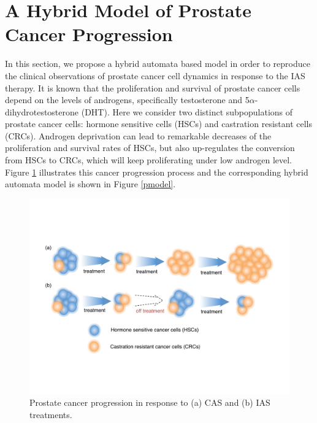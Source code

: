 \section{A Hybrid Model of Prostate Cancer Progression }\label{sec.model}

In this section, we propose a hybrid automata based model in order to reproduce the clinical observations \cite{bruchovsky06, bruchovsky07} of prostate cancer cell dynamics in response to the IAS therapy. It is known that the proliferation and survival of prostate cancer cells depend on the levels of androgens, specifically testosterone and 5$\alpha$-dihydrotestosterone (DHT). %
Here we consider two distinct subpopulations of prostate cancer cells: hormone sensitive cells (HSCs) and castration resistant cells (CRCs). Androgen deprivation can lead to remarkable decreases of the proliferation and survival rates of HSCs, but also up-regulates the conversion from HSCs to CRCs, which will keep proliferating under low androgen level. Figure \ref{progression} illustrates this cancer progression process and the corresponding hybrid automata model is shown in Figure \ref{pmodel}. 

\begin{figure}[htb]
\centering
\includegraphics[scale=0.38]{fig-progression}
\caption{Prostate cancer progression in response to (a) CAS and (b) IAS treatments.}
\label{progression}
\end{figure}

